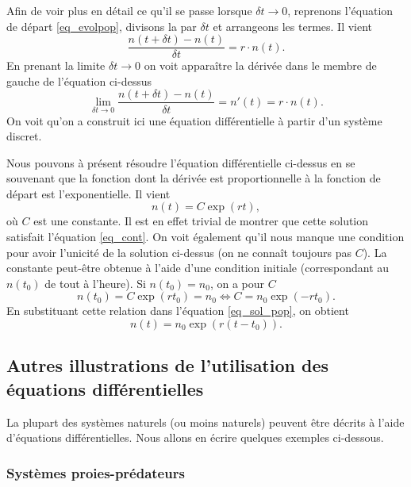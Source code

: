 \documentclass[a4paper,12pt]{book}
\renewcommand{\eqref}[1]{\ref{#1}}
\begin{document}
Afin de voir plus en détail ce qu'il se passe lorsque $\delta t\rightarrow 0$, reprenons l'équation de départ \eqref{eq_evolpop},
divisons la par $\delta t$ et arrangeons les termes. Il vient
\begin{equation}
 \frac{n(t+\delta t)-n(t)}{\delta t}=r\cdot n(t).
\end{equation}
En prenant la limite $\delta t\rightarrow 0$ on voit apparaître la dérivée dans le membre de gauche de l'équation ci-dessus
\begin{equation}
 \lim\limits_{\delta t\rightarrow 0} \frac{n(t+\delta t)-n(t)}{\delta t}=n'(t)=r\cdot n(t).\label{eq_cont}
\end{equation}
On voit qu'on a construit ici une équation différentielle à partir d'un système discret.

Nous pouvons à présent résoudre l'équation différentielle ci-dessus en se souvenant que 
la fonction dont la dérivée est proportionnelle à la fonction de départ est l'exponentielle.
Il vient
\begin{equation}
 n(t)=C\exp(r t),\label{eq_sol_pop}
\end{equation}
où $C$ est une constante.
Il est en effet trivial de montrer que cette solution satisfait l'équation \eqref{eq_cont}. 
On voit également qu'il nous manque une condition pour avoir l'unicité de la solution ci-dessus (on
ne connaît toujours pas $C$). La constante peut-être obtenue à l'aide d'une condition initiale (correspondant 
au $n(t_0)$ de tout à l'heure). Si $n(t_0)=n_0$, on a pour $C$
\begin{equation}
 n(t_0)=C\exp(r t_0)=n_0 \Leftrightarrow C=n_0\exp(-r t_0).
\end{equation}
En substituant cette relation dans l'équation \eqref{eq_sol_pop}, on obtient
\begin{equation}
 n(t)=n_0\exp(r (t-t_0)).
\end{equation}

\subsection{Autres illustrations de l'utilisation des équations différentielles}

La plupart des systèmes naturels (ou moins naturels) peuvent être décrits à l'aide d'équations différentielles.
Nous allons en écrire quelques exemples ci-dessous.

\subsubsection{Systèmes proies-prédateurs}
\end{document}
